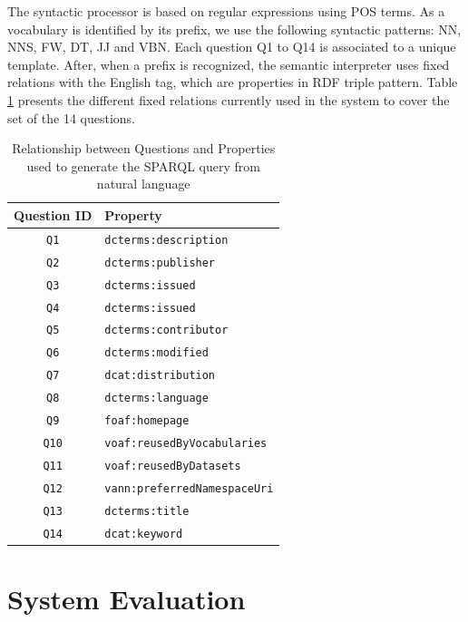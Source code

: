 \documentclass{acm}
\begin{document}
The syntactic processor is based on regular expressions using POS terms. As a vocabulary is identified by its prefix, we use  the following syntactic patterns: NN, NNS, FW, DT, JJ and VBN. Each question Q1 to Q14 is associated to a unique template. After, when a prefix is recognized, the semantic interpreter uses fixed relations with the English tag, which are properties in RDF triple pattern. Table \ref{tab:propTable} presents the different fixed relations currently used in the system to cover the set of the 14 questions.

\begin{table}
\centering
\caption{Relationship between Questions and Properties used to generate the SPARQL query from natural language}
\label{tab:propTable}
\begin{tabular}{|c|l|} \hline
\textbf{Question ID} & \textbf{Property} \\ \hline
\texttt{Q1} & \texttt{dcterms:description}  \\ \hline
\texttt{Q2} & \texttt{dcterms:publisher}  \\ \hline 
\texttt{Q3} & \texttt{dcterms:issued}  \\ \hline
\texttt{Q4} & \texttt{dcterms:issued}  \\ \hline
\texttt{Q5} & \texttt{dcterms:contributor}  \\ \hline
\texttt{Q6} & \texttt{dcterms:modified}  \\ \hline
\texttt{Q7} & \texttt{dcat:distribution}  \\ \hline
\texttt{Q8} & \texttt{dcterms:language}  \\ \hline
\texttt{Q9} & \texttt{foaf:homepage}  \\ \hline
\texttt{Q10} & \texttt{voaf:reusedByVocabularies} \\ \hline
\texttt{Q11} & \texttt{voaf:reusedByDatasets} \\ \hline
\texttt{Q12} & \texttt{vann:preferredNamespaceUri} \\ \hline
\texttt{Q13} & \texttt{dcterms:title} \\ \hline
\texttt{Q14} & \texttt{dcat:keyword} \\ \hline

\end{tabular}
\end{table}




\section{System Evaluation}
\label{sec:evaluation}
\end{document}
